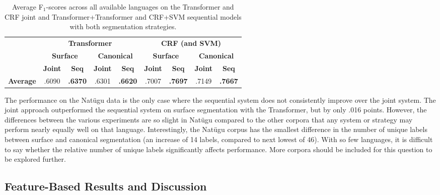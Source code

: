 \begin{table}[!tb]
    \centering
    \begin{tabular}{l|cc|cc|cc|cc}
          & \multicolumn{4}{c|}{\textbf{Transformer}} & \multicolumn{4}{c}{\textbf{CRF (and SVM)}} 
          \\
          & \multicolumn{2}{c|}{\textbf{Surface}} & \multicolumn{2}{c|}{\textbf{Canonical}}  & \multicolumn{2}{c|}{\textbf{Surface}} & \multicolumn{2}{c}{\textbf{Canonical}} 
          \\
          &  \textbf{Joint} & \textbf{Seq} &  \textbf{Joint} & \textbf{Seq} &  \textbf{Joint} & \textbf{Seq} &  \textbf{Joint} & \textbf{Seq} \\
         \hline
         \textbf{Average} & .6090 & \textbf{.6370} & .6301 & \textbf{.6620} 
                 & .7007 & \textbf{.7697} & .7149 & \textbf{.7667} \\
    \end{tabular}
    \caption[Average Results of All Joint and Sequential models]{Average F$_1$-scores across all available languages on the Transformer and CRF joint and Transformer+Transformer and CRF+SVM sequential models with both segmentation strategies.}
    \label{tab:avgsgresults}
\end{table}

The performance on the Nat\"ugu data is the only case where the sequential system does not consistently improve over the joint system. The joint approach outperformed the sequential system on surface segmentation with the Transformer, but by only .016 points. However, the differences between the various experiments are so slight in Nat\"ugu compared to the other corpora that any system or strategy may perform nearly equally well on that language. Interestingly, the Nat\"ugu corpus has the smallest difference in the number of unique labels between surface and canonical segmentation (an increase of 14 labels, compared to next lowest of 46). With so few languages, it is difficult to say whether the relative number of unique labels significantly affects performance. More corpora should be included for this question to be explored further. 
 

\subsection{Feature-Based Results and Discussion}
\label{sec:sgFtrAnalysis}

